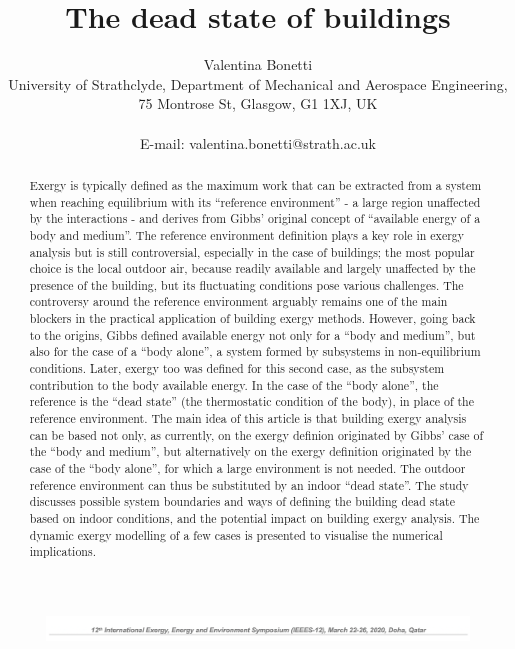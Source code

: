 \documentclass[10pt]{extarticle} %
\title{The dead state of buildings}
\author{Valentina Bonetti\\ University of Strathclyde, Department of Mechanical and Aerospace Engineering, 75 Montrose St, Glasgow, G1 1XJ,  UK\\ \\ E-mail: valentina.bonetti@strath.ac.uk}
\date{}
\begin{document}
\renewcommand{\abstractname}{Abstract:}



\begin{figure}[!h]
\centering
\includegraphics[width=6.8in, center]{images/articleHeading1.png}
\end{figure}

\let\newpage\relax
\vspace*{-2cm}
\maketitle
\vspace*{-1cm}


\begin{abstract}

\noindent Exergy is typically defined as the maximum work that can be extracted from a system when reaching equilibrium with its ``reference environment'' - a large region unaffected by the interactions - and derives from Gibbs' original concept of ``available energy of a body and medium''. The reference environment definition  plays a key role in exergy analysis but is still controversial, especially in the case of buildings; the most popular choice is the local outdoor air, because readily available and largely unaffected by the presence of the building, but its fluctuating conditions pose various challenges. The controversy around the reference environment arguably remains one of the main blockers in the practical application of building exergy methods.
However, going back to the origins, Gibbs defined available energy not only for a ``body and medium'', but also for the case of a ``body alone'', a system formed by subsystems in non-equilibrium conditions. Later, exergy too was defined for this second case, as the subsystem contribution to the body available energy. In the case of the ``body alone'', the reference is the ``dead state'' (the thermostatic condition of the body), in place of the reference environment. 
The main idea of this article is that building exergy analysis can be based not only, as currently, on the exergy definion originated by Gibbs' case of the ``body and medium'', but alternatively on the exergy definition originated by the case of the  ``body alone'', for which a large environment is not needed.  The outdoor reference environment can thus be substituted by an indoor ``dead state''. 
The study discusses possible system boundaries and ways of defining the building dead state based on indoor conditions, and the potential impact on building exergy analysis. The dynamic exergy modelling of a few cases is presented to visualise the numerical implications.

\end{abstract}
\end{document}

